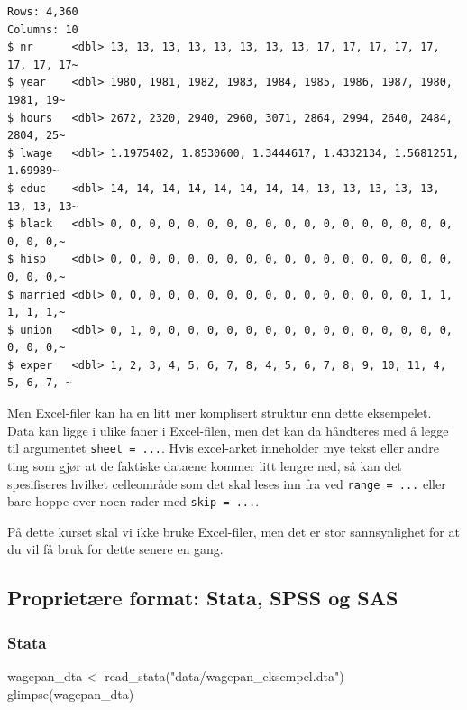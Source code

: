 \documentclass[
  norsk,
  letterpaper,
  DIV=11,
  numbers=noendperiod]{scrreprt}
\newenvironment{Shaded}{\begin{snugshade}}{\end{snugshade}}
\newcommand{\FunctionTok}[1]{\textcolor[rgb]{0.28,0.35,0.67}{#1}}
\newcommand{\NormalTok}[1]{\textcolor[rgb]{0.00,0.23,0.31}{#1}}
\newcommand{\OtherTok}[1]{\textcolor[rgb]{0.00,0.23,0.31}{#1}}
\newcommand{\StringTok}[1]{\textcolor[rgb]{0.13,0.47,0.30}{#1}}
\theoremstyle{definition}
\theoremstyle{remark}
\begin{document}
\begin{verbatim}
Rows: 4,360
Columns: 10
$ nr      <dbl> 13, 13, 13, 13, 13, 13, 13, 13, 17, 17, 17, 17, 17, 17, 17, 17~
$ year    <dbl> 1980, 1981, 1982, 1983, 1984, 1985, 1986, 1987, 1980, 1981, 19~
$ hours   <dbl> 2672, 2320, 2940, 2960, 3071, 2864, 2994, 2640, 2484, 2804, 25~
$ lwage   <dbl> 1.1975402, 1.8530600, 1.3444617, 1.4332134, 1.5681251, 1.69989~
$ educ    <dbl> 14, 14, 14, 14, 14, 14, 14, 14, 13, 13, 13, 13, 13, 13, 13, 13~
$ black   <dbl> 0, 0, 0, 0, 0, 0, 0, 0, 0, 0, 0, 0, 0, 0, 0, 0, 0, 0, 0, 0, 0,~
$ hisp    <dbl> 0, 0, 0, 0, 0, 0, 0, 0, 0, 0, 0, 0, 0, 0, 0, 0, 0, 0, 0, 0, 0,~
$ married <dbl> 0, 0, 0, 0, 0, 0, 0, 0, 0, 0, 0, 0, 0, 0, 0, 0, 1, 1, 1, 1, 1,~
$ union   <dbl> 0, 1, 0, 0, 0, 0, 0, 0, 0, 0, 0, 0, 0, 0, 0, 0, 0, 0, 0, 0, 0,~
$ exper   <dbl> 1, 2, 3, 4, 5, 6, 7, 8, 4, 5, 6, 7, 8, 9, 10, 11, 4, 5, 6, 7, ~
\end{verbatim}

Men Excel-filer kan ha en litt mer komplisert struktur enn dette
eksempelet. Data kan ligge i ulike faner i Excel-filen, men det kan da
håndteres med å legge til argumentet \texttt{sheet\ =\ ...}. Hvis
excel-arket inneholder mye tekst eller andre ting som gjør at de
faktiske dataene kommer litt lengre ned, så kan det spesifiseres hvilket
celleområde som det skal leses inn fra ved \texttt{range\ =\ ...} eller
bare hoppe over noen rader med \texttt{skip\ =\ ...}.

På dette kurset skal vi ikke bruke Excel-filer, men det er stor
sannsynlighet for at du vil få bruk for dette senere en gang.

\subsection{Proprietære format: Stata, SPSS og
SAS}\label{proprietuxe6re-format-stata-spss-og-sas}

\subsubsection{Stata}\label{stata}

\begin{Shaded}
\begin{Highlighting}[]
\NormalTok{wagepan\_dta }\OtherTok{\textless{}{-}} \FunctionTok{read\_stata}\NormalTok{(}\StringTok{"data/wagepan\_eksempel.dta"}\NormalTok{)}
\FunctionTok{glimpse}\NormalTok{(wagepan\_dta)}
\end{Highlighting}
\end{Shaded}
\end{document}
